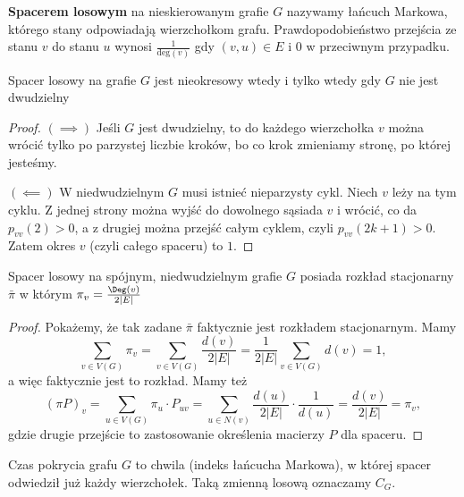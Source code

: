 \begin{definition}
	\textbf{Spacerem losowym} na nieskierowanym grafie \( G \) nazywamy łańcuch Markowa, którego stany odpowiadają wierzchołkom grafu. Prawdopodobieństwo przejścia ze stanu \( v \) do stanu \( u \) wynosi \( \frac{1}{\text{deg}(v)} \) gdy \( (v, u) \in E\) i 0 w przeciwnym przypadku.
\end{definition}

\begin{theorem}[Lemat 7.12 P\&C] Spacer losowy na grafie \( G \) jest nieokresowy wtedy i tylko wtedy gdy \( G \) nie jest dwudzielny
\end{theorem}
\begin{proof}
	\(\left( \implies \right) \) Jeśli \(G\) jest dwudzielny, to do każdego wierzchołka \(v\) można wrócić tylko po parzystej liczbie kroków, bo co krok zmieniamy stronę, po której jesteśmy.

	\(\left( \impliedby \right) \) W niedwudzielnym \(G\) musi istnieć nieparzysty cykl. Niech \(v\) leży na tym cyklu. Z jednej strony można wyjść do dowolnego sąsiada \(v\) i wrócić, co da \(p_{vv} \left( 2 \right) >0\), a z drugiej można przejść całym cyklem, czyli \(p_{vv} \left( 2k+1 \right) >0\). Zatem okres \(v\) (czyli całego spaceru) to \(1\).
\end{proof}

\begin{theorem}[Lemat 7.13 P\&C] Spacer losowy na spójnym, niedwudzielnym grafie \( G \) posiada rozkład stacjonarny \( \bar \pi \) w którym \( \pi_v = \frac{\Deg(v)}{2|E|} \)
\end{theorem}
\begin{proof}
	Pokażemy, że tak zadane \(\bar\pi\) faktycznie jest rozkładem stacjonarnym. Mamy
	\[ \sum_{v\in V \left( G  \right) }^{} \pi_v = \sum_{v\in V \left( G  \right) }^{} \frac{d \left( v  \right) }{2 |E| } = \frac{1}{2 |E|} \sum_{v\in V \left( G  \right) }^{} d \left( v  \right) = 1, \]
	a więc faktycznie jest to rozkład. Mamy też
	\[ \left( \pi P \right)_v  = \sum_{u \in V \left( G  \right)}^{} \pi_u \cdot P_{uv} = \sum_{u \in N \left( v \right) }^{} \frac{d \left( u  \right) }{2 |E| } \cdot \frac{1}{d \left( u \right) } = \frac{d \left( v  \right) }{2 |E| } = \pi_v,\]
	gdzie drugie przejście to zastosowanie określenia macierzy \(P\) dla spaceru.
\end{proof}

\begin{definition}
	Czas pokrycia grafu \(G\) to chwila (indeks łańcucha Markowa), w której spacer odwiedził już każdy wierzchołek. Taką zmienną losową oznaczamy \(C_G\).
\end{definition}


